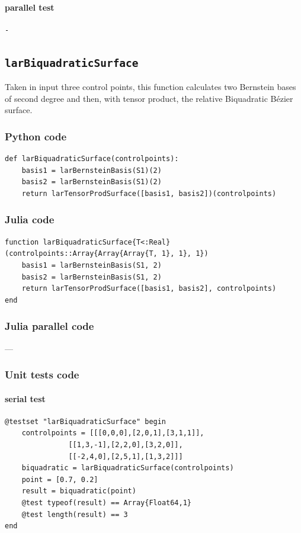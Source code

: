 \documentclass[a4paper,11pt]{article}
\begin{document}
\paragraph{parallel test}
\begin{verbatim}
-
\end{verbatim}


\subsection{\texttt{larBiquadraticSurface}}

Taken in input three control points, this function calculates two Bernstein bases of second degree and then, with tensor product, the relative Biquadratic B\'ezier surface.

\subsubsection{Python code}

\begin{verbatim}
def larBiquadraticSurface(controlpoints):
    basis1 = larBernsteinBasis(S1)(2)
    basis2 = larBernsteinBasis(S1)(2)
    return larTensorProdSurface([basis1, basis2])(controlpoints)
\end{verbatim}

\subsubsection{Julia code}

\begin{verbatim}
function larBiquadraticSurface{T<:Real}(controlpoints::Array{Array{Array{T, 1}, 1}, 1})
    basis1 = larBernsteinBasis(S1, 2)
    basis2 = larBernsteinBasis(S1, 2)
    return larTensorProdSurface([basis1, basis2], controlpoints)
end
\end{verbatim}

\subsubsection{Julia parallel code}
---

\subsubsection{Unit tests code}

\paragraph{serial test}
\begin{verbatim}
@testset "larBiquadraticSurface" begin
    controlpoints = [[[0,0,0],[2,0,1],[3,1,1]],
               [[1,3,-1],[2,2,0],[3,2,0]],
               [[-2,4,0],[2,5,1],[1,3,2]]]
    biquadratic = larBiquadraticSurface(controlpoints)
    point = [0.7, 0.2]
    result = biquadratic(point)
    @test typeof(result) == Array{Float64,1}
    @test length(result) == 3
end
\end{verbatim}
\end{document}
